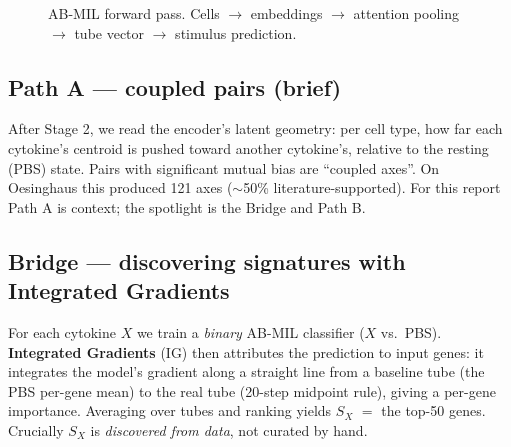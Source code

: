\documentclass[11pt]{article}
\newcommand{\Sx}{\ensuremath{S_X}}
\begin{document}
\begin{figure}[h]\centering
{}
\caption{AB-MIL forward pass. Cells $\to$ embeddings $\to$ attention pooling $\to$
tube vector $\to$ stimulus prediction.}\label{fig:f7}
\end{figure}

\subsection{Path A --- coupled pairs (brief)}
After Stage 2, we read the encoder's latent geometry: per cell type, how far each
cytokine's centroid is pushed toward another cytokine's, relative to the resting
(PBS) state. Pairs with significant mutual bias are ``coupled axes''. On
Oesinghaus this produced 121 axes ($\sim$50\% literature-supported). For this
report Path A is context; the spotlight is the Bridge and Path B.

\subsection{Bridge --- discovering signatures with Integrated Gradients}
For each cytokine $X$ we train a \emph{binary} AB-MIL classifier ($X$ vs.\ PBS).
\textbf{Integrated Gradients} (IG) then attributes the prediction to input genes:
it integrates the model's gradient along a straight line from a baseline tube
(the PBS per-gene mean) to the real tube (20-step midpoint rule), giving a
per-gene importance. Averaging over tubes and ranking yields \Sx{} $=$ the top-50
genes. Crucially \Sx{} is \emph{discovered from data}, not curated by hand.
\end{document}
